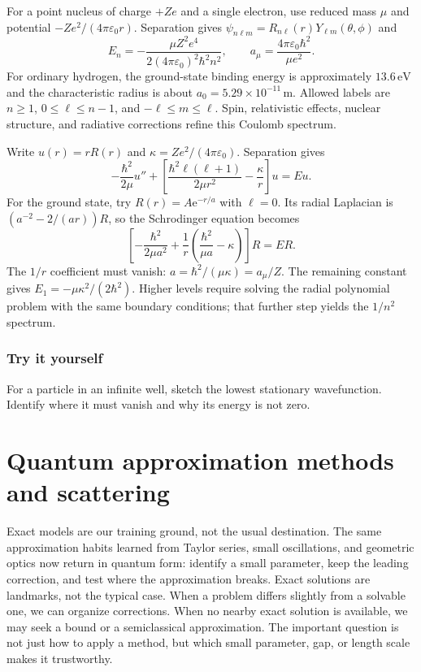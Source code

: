 \documentclass[11pt,oneside]{book}
\newcommand{\ee}{\mathrm{e}}
\newcommand{\eps}{\varepsilon_0}
\theoremstyle{reviewstyle}
\newcommand{\learningcheck}[1]{\subsection*{Try it yourself}\noindent #1\par}
\begin{document}
For a point nucleus of charge $+Ze$ and a single electron, use reduced mass $\mu$ and potential $-Ze^2/(4\pi\eps r)$. Separation gives $\psi_{n\ell m}=R_{n\ell}(r)Y_{\ell m}(\theta,\phi)$ and
\begin{equation}E_n=-\frac{\mu Z^2e^4}{2(4\pi\eps)^2\hbar^2n^2},\qquad a_\mu=\frac{4\pi\eps\hbar^2}{\mu e^2}.\end{equation}
For ordinary hydrogen, the ground-state binding energy is approximately $13.6\,\mathrm{eV}$ and the characteristic radius is about $a_0=5.29\times10^{-11}\,\mathrm m$. Allowed labels are $n\geq1$, $0\leq\ell\leq n-1$, and $-\ell\leq m\leq\ell$. Spin, relativistic effects, nuclear structure, and radiative corrections refine this Coulomb spectrum.

Write $u(r)=rR(r)$ and $\kappa=Ze^2/(4\pi\eps)$. Separation gives
\begin{equation}
-\frac{\hbar^2}{2\mu}u''+
\left[\frac{\hbar^2\ell(\ell+1)}{2\mu r^2}-\frac\kappa r\right]u=Eu.
\end{equation}
For the ground state, try $R(r)=A\ee^{-r/a}$ with $\ell=0$. Its radial Laplacian is $(a^{-2}-2/(ar))R$, so the Schrodinger equation becomes
\begin{equation}
\left[-\frac{\hbar^2}{2\mu a^2}
+\frac1r\left(\frac{\hbar^2}{\mu a}-\kappa\right)\right]R=ER.
\end{equation}
The $1/r$ coefficient must vanish: $a=\hbar^2/(\mu\kappa)=a_\mu/Z$. The remaining constant gives $E_1=-\mu\kappa^2/(2\hbar^2)$. Higher levels require solving the radial polynomial problem with the same boundary conditions; that further step yields the $1/n^2$ spectrum.

\learningcheck{For a particle in an infinite well, sketch the lowest stationary wavefunction. Identify where it must vanish and why its energy is not zero.}

\chapter{Quantum approximation methods and scattering}
Exact models are our training ground, not the usual destination. The same approximation habits learned from Taylor series, small oscillations, and geometric optics now return in quantum form: identify a small parameter, keep the leading correction, and test where the approximation breaks.
Exact solutions are landmarks, not the typical case. When a problem differs slightly from a solvable one, we can organize corrections. When no nearby exact solution is available, we may seek a bound or a semiclassical approximation. The important question is not just how to apply a method, but which small parameter, gap, or length scale makes it trustworthy.
\end{document}
